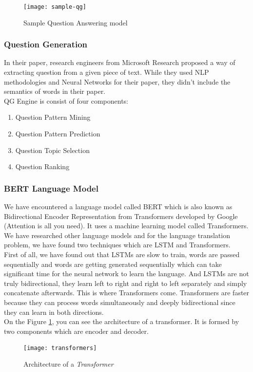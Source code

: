 \documentclass{mefsdp}
\begin{document}
	\begin{figure}[ht!]
		\centering
		\texttt{[image: sample-qg]}
		\caption{Sample Question Answering model}
	\end{figure}

	\subsubsection{Question Generation}
	In their paper, research engineers from Microsoft Research proposed a way of extracting question from a given piece of text. \cite{duan2017question} While they used NLP methodologies and Neural Networks for their paper, they didn’t include the semantics of words in their paper.\\
	
	QG Engine is consist of four components:
	\begin{enumerate}
		\item Question Pattern Mining
		\item Question Pattern Prediction
		\item Question Topic Selection
		\item Question Ranking
	\end{enumerate}
	\subsubsection{BERT Language Model}
	We have encountered a language model called BERT which is also known as Bidirectional Encoder Representation from Transformers developed by Google (Attention is all you need). It uses a machine learning model called Transformers. We have researched other language models and for the language translation problem, we have found two techniques which are LSTM and Transformers.\\
	
	First of all, we have found out that LSTMs are slow to train, words are passed sequentially and words are getting generated sequentially which can take significant time for the neural network to learn the language. And LSTMs are not truly bidirectional, they learn left to right and right to left separately and simply concatenate afterwards. This is where Transformers come. Transformers are faster because they can process words simultaneously and deeply bidirectional since they can learn in both directions. \\
	
	On the Figure \ref{transformer}, you can see the architecture of a transformer. It is formed by two components which are encoder and decoder.\\
	\begin{figure}[ht!]
		\centering
		\texttt{[image: transformers]}
		\caption{Architecture of a \textit{Transformer}\label{transformer}}
	\end{figure}
\end{document}

